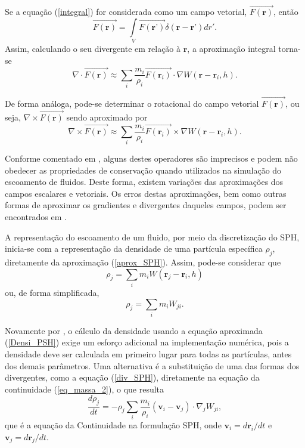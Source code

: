 Se a equação (\ref{integral}) for considerada como um campo vetorial, $\vec{F(\textbf{r})}$, então
\begin{equation}
\vec{F(\textbf{r})} = \int\limits_{V} \vec{F(\textbf{r'})} \delta (\textbf{r} - \textbf{r'})dr'.
\end{equation} 
Assim, calculando o seu divergente em relação à $\textbf{r}$, a aproximação integral torna-se
\begin{equation} \label{div_SPH}
\nabla \cdot \vec{F(\textbf{r})} \approx \sum\limits_{i} \frac{m_{i}}{\rho_{i}} \vec{F(\textbf{r}_{i})}  \cdot \nabla W(\textbf{r} - \textbf{r}_{i},h). 
\end{equation}

De forma análoga, pode-se determinar o rotacional do campo vetorial $\vec{F(\textbf{r})}$, ou seja, $\nabla \times \vec{F(\textbf{r})}$ sendo aproximado por
\begin{equation} \label{rot_SPH}
\nabla \times \vec{F(\textbf{r})} \approx \sum\limits_{i} \frac{m_{i}}{\rho_{i}} \vec{F(\textbf{r}_{i})}  \times \nabla W(\textbf{r} - \textbf{r}_{i},h).
\end{equation}

Conforme comentado em , alguns destes operadores são imprecisos e podem não obedecer as propriedades de conservação quando utilizados na simulação do escoamento de fluidos. Deste forma, existem variações das aproximações dos campos escalares e vetoriais. Os erros destas aproximações, bem como outras formas de aproximar os gradientes e divergentes daqueles campos, podem ser encontrados em .

A representação do escoamento de um fluido, por meio da discretização do SPH, inicia-se com a representação da densidade de uma partícula específica $\rho_{j}$, diretamente da aproximação (\ref{aprox_SPH}). Assim, pode-se considerar que
\begin{equation}
\rho_{j} = \sum\limits_{i} m_{i} W(\textbf{r}_{j} - \textbf{r}_{i},h)
\end{equation}
ou, de forma simplificada,
\begin{equation} \label{Densi_PSH}
\rho_{j} = \sum\limits_{i} m_{i} W_{ji}.
\end{equation} 

Novamente por , o cálculo da densidade usando a equação aproximada (\ref{Densi_PSH}) exige um esforço adicional na implementação numérica, pois a densidade deve ser calculada em primeiro lugar para todas as partículas, antes dos demais parâmetros. Uma alternativa é a substituição de uma das formas dos divergentes, como a equação (\ref{div_SPH}), diretamente na equação da continuidade (\ref{eq_massa_2}), o que resulta 
\begin{equation} \label{Cont_SPH}
\frac{d \rho_{j}}{dt} = -\rho_{j} \sum\limits_{i} \frac{m_{i}}{\rho_{i}} (\textbf{v}_{i} - \textbf{v}_{j}) \cdot \nabla_{j}W_{ji},
\end{equation}
que é a equação da Continuidade na formulação SPH, onde $\textbf{v}_{i} = {d \textbf{r}_{i}}/{dt}$ e $\textbf{v}_{j} = {d \textbf{r}_{j}}/{dt}$.

